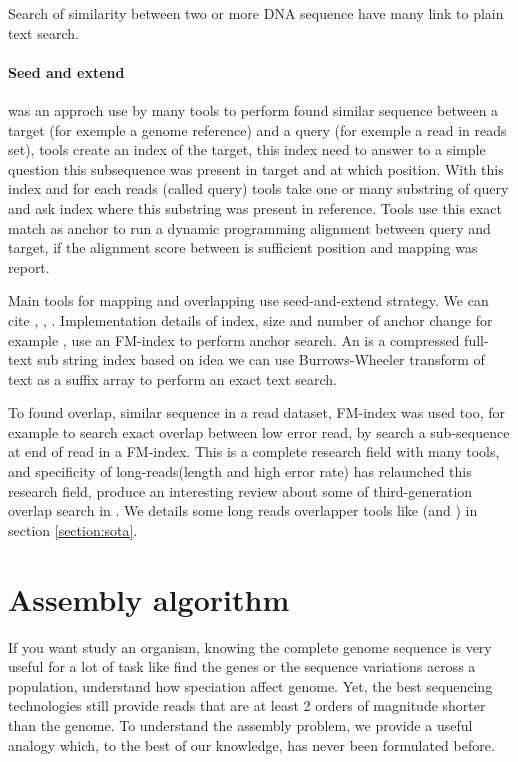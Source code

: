 \documentclass[./main.tex]{subfiles}
\begin{document}
Search of similarity between two or more DNA sequence have many link to plain text search.

\paragraph{Seed and extend} was an approch use by many tools to perform found similar sequence between a target (for exemple a genome reference) and a query (for exemple a read in reads set), tools create an index of the target, this index need to answer to a simple question this subsequence was present in target and at which position. With this index and for each reads (called query) tools take one or many substring of query and ask index where this substring was present in reference. Tools use this exact match as anchor to run a \citeauthor{smith_waterman}\cite{smith_waterman} dynamic programming alignment between query and target, if the alignment score between is sufficient position and mapping was report.

Main tools for mapping and overlapping use seed-and-extend strategy. We can cite  \cite{blast_one, blast_two},  \cite{bwa_mem},  \cite{blasr}. Implementation details of index, size and number of anchor change for example ,  use an FM-index \cite{fm-index} to perform anchor search. An is a compressed full-text sub string index based on idea we can use Burrows-Wheeler transform of text as a suffix array to perform an exact text search. 

To found overlap, similar sequence in a read dataset, FM-index was used too, for example  \cite{SGA} to search exact overlap between low error read, by search a sub-sequence at end of read in a FM-index. This is a complete research field with many tools, and specificity of long-reads(length and high error rate) has relaunched this research field, \citeauthor{ovl_bench} produce an interesting review about some of third-generation overlap search in \cite{ovl_bench}. We details some long reads overlapper tools like (\mhap and \minimap) in section \ref{section:sota}.

\section{Assembly algorithm}

If you want study an organism, knowing the complete genome sequence is very useful for a lot of task like find the genes or the sequence variations across a population, understand how speciation affect genome. Yet, the best sequencing technologies still provide reads that are at least 2 orders of magnitude shorter than the genome. To understand the assembly problem, we provide a useful analogy which, to the best of our knowledge, has never been formulated before.
\end{document}
